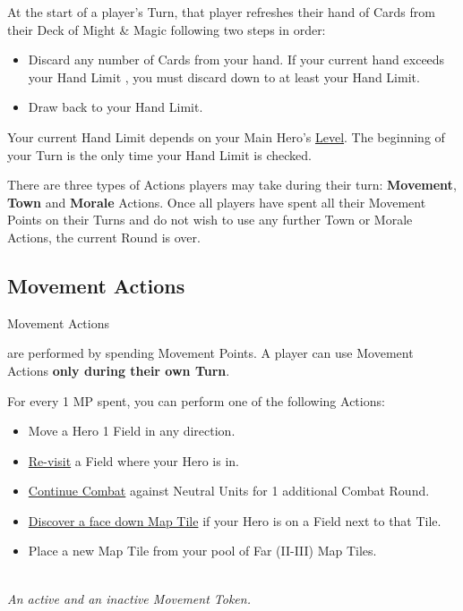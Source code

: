 
\begin{multicols*}{2}

At the start of a player's Turn, that player refreshes their hand of Cards from their Deck of Might \& Magic following two steps in order:
\begin{itemize}
  \item Discard any number of Cards from your hand.
If your current hand exceeds your Hand Limit , you must discard down to at least your Hand Limit.
  \item Draw back to your Hand Limit.
\end{itemize}
Your current Hand Limit depends on your Main Hero's \hyperlink{Level}{Level}.
The beginning of your Turn is the only time your Hand Limit is checked.\par
There are three types of Actions players may take during their turn: \textbf{Movement}, \textbf{Town} and \textbf{Morale} Actions.
Once all players have spent all their Movement Points on their Turns and do not wish to use any further Town or Morale Actions, the current Round is over.
\subsection*{Movement Actions}
\hypertarget{Movement}{Movement Actions} are performed by spending Movement Points.
A player can use Movement Actions \textbf{only during their own Turn}.\par
For every 1 MP spent, you can perform one of the following Actions:
\begin{itemize}
  \item Move a Hero 1 Field in any direction.
  \item \hyperlink{Categories}{Re-visit} a Field where your Hero is in.
  \item \hyperlink{Timelimit}{Continue Combat} against Neutral Units for 1 additional Combat Round.
  \item \hyperlink{Placing}{Discover a face down Map Tile} if your Hero is on a Field next to that Tile.
  \item Place a new Map Tile from your pool of Far (II-III) Map Tiles.
\end{itemize}

\begin{center}
  \\
  \medskip
  \footnotesize\textit{An active and an inactive Movement Token.}
\end{center}


\end{multicols*}
